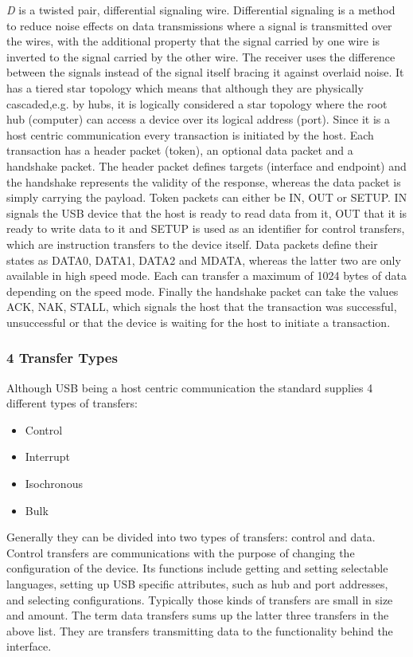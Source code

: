 \emph{D} is a twisted pair, differential signaling wire. Differential signaling is a method to reduce noise effects on data transmissions where a signal is transmitted over the wires, with the additional property that the signal carried by one wire is inverted to the signal carried by the other wire. The receiver uses the difference between the signals instead of the signal itself bracing it against overlaid noise. 
It has a tiered star topology which means that although they are physically cascaded,e.g. by hubs, it is logically considered a star topology where the root hub (computer) can access a device over its logical address (port). 
Since it is a host centric communication every transaction is initiated by the host. Each transaction has a header packet (token), an optional data packet and a handshake packet. The header packet defines targets (interface and endpoint) and the handshake represents the validity of the response, whereas the data packet is simply carrying the payload.
Token packets can either be IN, OUT or SETUP. IN signals the USB device that the host is ready to read data from it, OUT that it is ready to write data to it and SETUP is used as an identifier for control transfers, which are instruction transfers to the device itself.
Data packets define their states as DATA0, DATA1, DATA2 and MDATA, whereas the latter two are only available in high speed mode. Each can transfer a maximum of 1024 bytes of data depending on the speed mode.
Finally the handshake packet can take the values ACK, NAK, STALL, which signals the host that the transaction was successful, unsuccessful or that the device is waiting for the host to initiate a transaction.

\subsubsection{4 Transfer Types}
Although USB being a host centric communication the standard supplies 4 different types of transfers: 
\begin{itemize}
 \item Control
 \item Interrupt
 \item Isochronous
 \item Bulk
\end{itemize}

Generally they can be divided into two types of transfers: control and data. Control transfers are communications with the purpose of changing the 
configuration of the device. Its functions include getting and setting selectable languages, setting up USB specific attributes, such as hub and port 
addresses, and selecting configurations. Typically those kinds of transfers are small in size and amount. 
The term data transfers sums up the latter three transfers in the above list. They are transfers transmitting data to the functionality 
behind the interface. 

